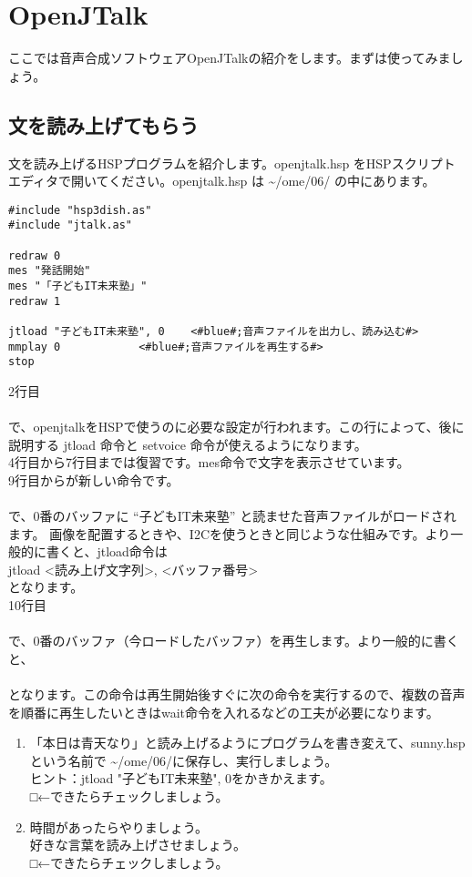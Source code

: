 \section{OpenJTalk}
ここでは音声合成ソフトウェアOpenJTalkの紹介をします。まずは使ってみましょう。
\subsection{文を読み上げてもらう}
文を読み上げるHSPプログラムを紹介します。openjtalk.hsp をHSPスクリプトエディタで開いてください。openjtalk.hsp は  \textasciitilde /ome/06/ の中にあります。\\

\begin{lstlisting}[caption=openjtalk.hsp,label=openjtalk.hsp]
#include "hsp3dish.as"
#include "jtalk.as"

redraw 0
mes "発話開始"
mes "「子どもIT未来塾」"
redraw 1

jtload "子どもIT未来塾", 0	<#blue#;音声ファイルを出力し、読み込む#>
mmplay 0			<#blue#;音声ファイルを再生する#>
stop
\end{lstlisting}

2行目\\
\\
で、openjtalkをHSPで使うのに必要な設定が行われます。この行によって、後に説明する jtload 命令と setvoice 命令が使えるようになります。\\
4行目から7行目までは復習です。mes命令で文字を表示させています。\\
9行目からが新しい命令です。\\
\\
で、0番のバッファに “子どもIT未来塾” と読ませた音声ファイルがロードされます。 画像を配置するときや、I2Cを使うときと同じような仕組みです。より一般的に書くと、jtload命令は\\
jtload <読み上げ文字列>, <バッファ番号>\\
となります。\\
10行目\\
\\
で、0番のバッファ（今ロードしたバッファ）を再生します。より一般的に書くと、\\
\\
となります。この命令は再生開始後すぐに次の命令を実行するので、複数の音声を順番に再生したいときはwait命令を入れるなどの工夫が必要になります。\\

\begin{tcolorbox}[title=\useOmetoi]
\begin{enumerate}
\item 「本日は青天なり」と読み上げるようにプログラムを書き変えて、sunny.hspという名前で \textasciitilde /ome/06/に保存し、実行しましょう。\\ヒント：jtload "子どもIT未来塾", 0をかきかえます。\\□←できたらチェックしましょう。
\item 時間があったらやりましょう。\\好きな言葉を読み上げさせましょう。\\□←できたらチェックしましょう。
\end{enumerate}
\end{tcolorbox}
